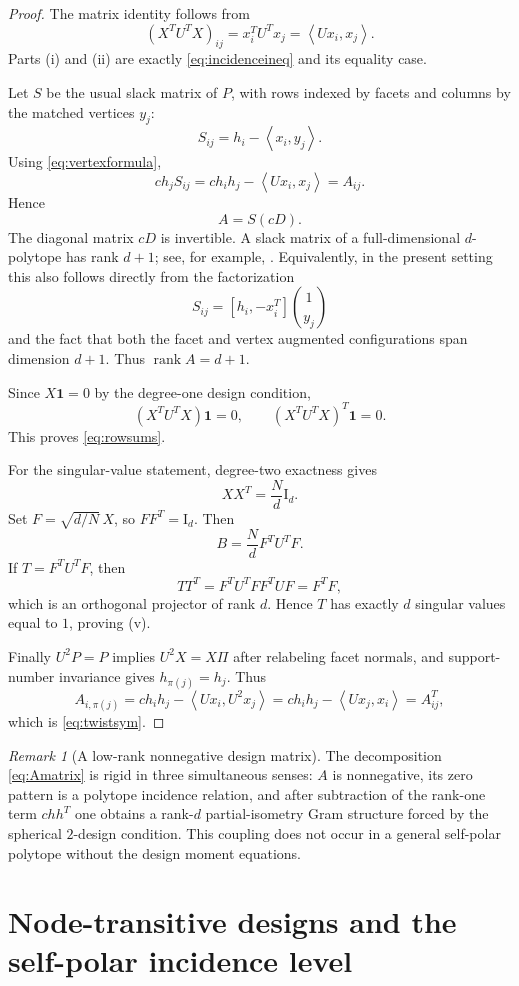 \documentclass[11pt]{amsart}
\theoremstyle{definition}
\theoremstyle{remark}
\newtheorem{remark}[theorem]{Remark}
\newcommand{\Id}{\mathrm I}
\newcommand{\rank}{\operatorname{rank}}
\newcommand{\ip}[2]{\left\langle #1,#2\right\rangle}
\begin{document}
\begin{proof}
The matrix identity follows from
\[
 (X^TU^TX)_{ij}=x_i^TU^Tx_j=\ip{Ux_i}{x_j}.
\]
Parts (i) and (ii) are exactly \eqref{eq:incidenceineq} and its equality case.

Let $S$ be the usual slack matrix of $P$, with rows indexed by facets and columns by the matched vertices $y_j$:
\[
 S_{ij}=h_i-\ip{x_i}{y_j}.
\]
Using \eqref{eq:vertexformula},
\[
 c h_j S_{ij}
 =c h_i h_j-\ip{Ux_i}{x_j}=A_{ij}.
\]
Hence
\begin{equation}\label{eq:ASD}
 A=S(cD).
\end{equation}
The diagonal matrix $cD$ is invertible.  A slack matrix of a full-dimensional $d$-polytope has rank $d+1$; see, for example, \cite{GouveiaEtAl2013}.  Equivalently, in the present setting this also follows directly from the factorization
\[
 S_{ij}=[h_i,-x_i^T]\binom{1}{y_j}
\]
and the fact that both the facet and vertex augmented configurations span dimension $d+1$.  Thus $\rank A=d+1$.

Since $X\mathbf1=0$ by the degree-one design condition,
\[
 (X^TU^TX)\mathbf1=0,
 \qquad
 (X^TU^TX)^T\mathbf1=0.
\]
This proves \eqref{eq:rowsums}.

For the singular-value statement, degree-two exactness gives
\[
 XX^T=\frac Nd\Id_d.
\]
Set $F=\sqrt{d/N}\,X$, so $FF^T=\Id_d$.  Then
\[
 B=\frac Nd F^TU^TF.
\]
If $T=F^TU^TF$, then
\[
 TT^T=F^TU^TFF^TUF=F^TF,
\]
which is an orthogonal projector of rank $d$.  Hence $T$ has exactly $d$ singular values equal to $1$, proving (v).

Finally $U^2P=P$ implies $U^2X=X\Pi$ after relabeling facet normals, and support-number invariance gives $h_{\pi(j)}=h_j$.  Thus
\[
 A_{i,\pi(j)}
 =c h_i h_j-\ip{Ux_i}{U^2x_j}
 =c h_i h_j-\ip{Ux_j}{x_i}
 =A^T_{ij},
\]
which is \eqref{eq:twistsym}.  \qedhere
\end{proof}

\begin{remark}[A low-rank nonnegative design matrix]
The decomposition \eqref{eq:Amatrix} is rigid in three simultaneous senses: $A$ is nonnegative, its zero pattern is a polytope incidence relation, and after subtraction of the rank-one term $c hh^T$ one obtains a rank-$d$ partial-isometry Gram structure forced by the spherical $2$-design condition.  This coupling does not occur in a general self-polar polytope without the design moment equations.
\end{remark}

\section{Node-transitive designs and the self-polar incidence level}
\label{sec:transitive}
\end{document}
